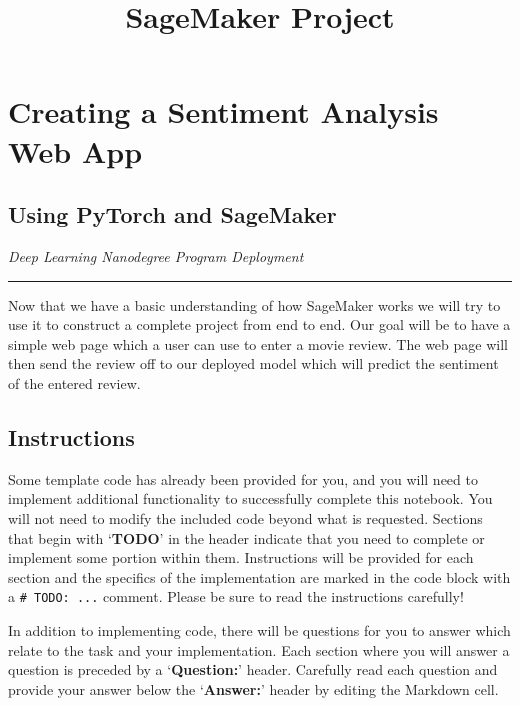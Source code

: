 \documentclass[11pt]{article}
\title{SageMaker Project}
\begin{document}
    
    
    \maketitle
    
    

    
    \hypertarget{creating-a-sentiment-analysis-web-app}{%
\section{Creating a Sentiment Analysis Web
App}\label{creating-a-sentiment-analysis-web-app}}

\hypertarget{using-pytorch-and-sagemaker}{%
\subsection{Using PyTorch and
SageMaker}\label{using-pytorch-and-sagemaker}}

\emph{Deep Learning Nanodegree Program \textbar{} Deployment}

\begin{center}\rule{0.5\linewidth}{\linethickness}\end{center}

Now that we have a basic understanding of how SageMaker works we will
try to use it to construct a complete project from end to end. Our goal
will be to have a simple web page which a user can use to enter a movie
review. The web page will then send the review off to our deployed model
which will predict the sentiment of the entered review.

\hypertarget{instructions}{%
\subsection{Instructions}\label{instructions}}

Some template code has already been provided for you, and you will need
to implement additional functionality to successfully complete this
notebook. You will not need to modify the included code beyond what is
requested. Sections that begin with `\textbf{TODO}' in the header
indicate that you need to complete or implement some portion within
them. Instructions will be provided for each section and the specifics
of the implementation are marked in the code block with a
\texttt{\#\ TODO:\ ...} comment. Please be sure to read the instructions
carefully!

In addition to implementing code, there will be questions for you to
answer which relate to the task and your implementation. Each section
where you will answer a question is preceded by a `\textbf{Question:}'
header. Carefully read each question and provide your answer below the
`\textbf{Answer:}' header by editing the Markdown cell.
\end{document}
